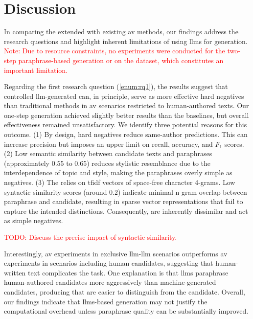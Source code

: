 \chapter{Discussion}
\label{chap:discussion}
In comparing the extended \impAppr{} with existing \ac{av} methods, our findings address the research questions and highlight inherent limitations of using \acp{llm} for \imp{} generation. 
\textcolor{red}{Note: Due to resource constraints, no experiments were conducted for the two-step paraphrase-based \imp{} generation or on the \dataPan{} dataset, which constitutes an important limitation.}

Regarding the first research question (\autoref{enum:rq1}), the results suggest that controlled \ac{llm}-generated \imps{} can, in principle, serve as more effective hard negatives than traditional methods in \ac{av} scenarios restricted to human-authored texts. 
Our one-step \imp{} generation achieved slightly better results than the baselines, but overall effectiveness remained unsatisfactory. 
We identify three potential reasons for this outcome.
(1) By design, hard negatives reduce same-author predictions. 
This can increase precision but imposes an upper limit on recall, accuracy, and $F_1$ scores. 
(2) Low semantic similarity between candidate texts and paraphrases (approximately $0.55$ to $0.65$) reduces stylistic resemblance due to the interdependence of topic and style, making the paraphrases overly simple as negatives. 
(3) The \impAppr{} relies on \ac{tfidf} vectors of space-free character 4-grams. 
Low syntactic similarity scores (around $0.2$) indicate minimal n-gram overlap between paraphrase and candidate, resulting in sparse vector representations that fail to capture the intended distinctions.
Consequently, \imps{} are inherently dissimilar and act as simple negatives. 

\textcolor{red}{TODO: Discuss the precise impact of syntactic similarity.}

Interestingly, \ac{av} experiments in exclusive \ac{llm}-\ac{llm} scenarios outperforms \ac{av} experiments in scenarios including human candidates, suggesting that human-written text complicates the task. 
One explanation is that \acp{llm} paraphrase human-authored candidates more aggressively than machine-gen\-erated candidates, producing \imps{} that are easier to distinguish from the candidate. 
Overall, our findings indicate that \acp{llm}-based \imp{} generation may not justify the computational overhead unless paraphrase quality can be substantially improved.

